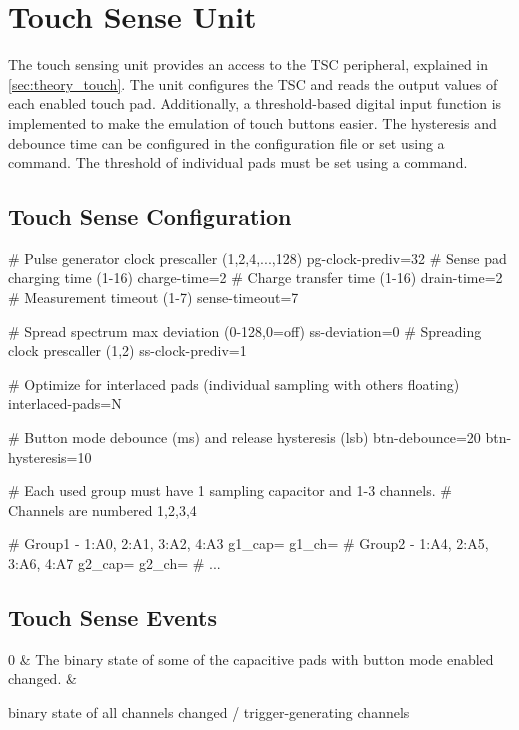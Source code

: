 \section{Touch Sense Unit}

The touch sensing unit provides an access to the \gls{TSC} peripheral, explained in \cref{sec:theory_touch}. The unit configures the \gls{TSC} and reads the output values of each enabled touch pad. Additionally, a threshold-based digital input function is implemented to make the emulation of touch buttons easier. The hysteresis and debounce time can be configured in the configuration file or set using a command. The threshold of individual pads must be set using a command.

\subsection{Touch Sense Configuration}

\begin{inicode}
# Pulse generator clock prescaller (1,2,4,...,128)
pg-clock-prediv=32
# Sense pad charging time (1-16)
charge-time=2
# Charge transfer time (1-16)
drain-time=2
# Measurement timeout (1-7)
sense-timeout=7

# Spread spectrum max deviation (0-128,0=off)
ss-deviation=0
# Spreading clock prescaller (1,2)
ss-clock-prediv=1

# Optimize for interlaced pads (individual sampling with others floating)
interlaced-pads=N

# Button mode debounce (ms) and release hysteresis (lsb)
btn-debounce=20
btn-hysteresis=10

# Each used group must have 1 sampling capacitor and 1-3 channels.
# Channels are numbered 1,2,3,4

# Group1 - 1:A0, 2:A1, 3:A2, 4:A3
g1_cap=
g1_ch=
# Group2 - 1:A4, 2:A5, 3:A6, 4:A7
g2_cap=
g2_ch=
# ...
\end{inicode}

\newpage
\subsection{Touch Sense Events}

\begin{cmdlist}
    0 & 
    The binary state of some of the capacitive pads with button mode enabled changed.
    & \begin{cmdpld}
         binary state of all channels
         changed / trigger-generating channels
    \end{cmdpld} \\
\end{cmdlist}

